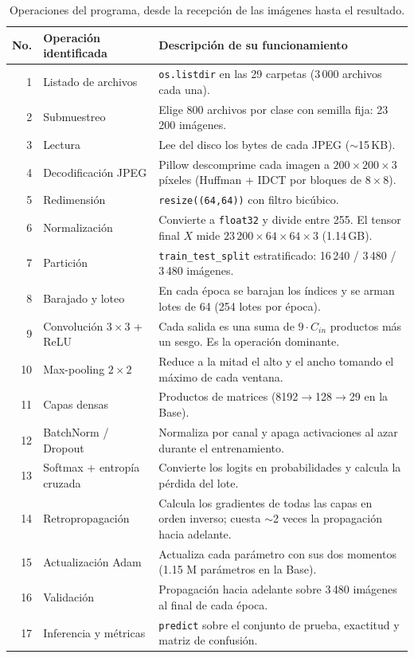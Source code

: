 \documentclass[11pt,letterpaper]{article}
\newcommand{\cod}[1]{\texttt{#1}}
\begin{document}
\begin{table}[H]\centering\small
\caption{Operaciones del programa, desde la recepción de las imágenes hasta el resultado.}
\label{tab:operaciones}
\begin{tabular}{rlp{10.2cm}}
\toprule
No. & Operación identificada & Descripción de su funcionamiento \\
\midrule
1 & Listado de archivos & \cod{os.listdir} en las 29 carpetas (3\,000 archivos cada una). \\
2 & Submuestreo & Elige 800 archivos por clase con semilla fija: 23\,200 imágenes. \\
3 & Lectura & Lee del disco los bytes de cada JPEG ($\sim$15\,KB). \\
4 & Decodificación JPEG & Pillow descomprime cada imagen a $200\times200\times3$ píxeles (Huffman + IDCT por bloques de $8\times8$). \\
5 & Redimensión & \cod{resize((64,64))} con filtro bicúbico. \\
6 & Normalización & Convierte a \cod{float32} y divide entre 255. El tensor final $X$ mide $23\,200\times64\times64\times3$ (1.14\,GB). \\
7 & Partición & \cod{train\_test\_split} estratificado: 16\,240 / 3\,480 / 3\,480 imágenes. \\
8 & Barajado y loteo & En cada época se barajan los índices y se arman lotes de 64 (254 lotes por época). \\
9 & Convolución $3\times3$ + ReLU & Cada salida es una suma de $9\cdot C_{in}$ productos más un sesgo. Es la operación dominante. \\
10 & Max-pooling $2\times2$ & Reduce a la mitad el alto y el ancho tomando el máximo de cada ventana. \\
11 & Capas densas & Productos de matrices (8192$\rightarrow$128$\rightarrow$29 en la Base). \\
12 & BatchNorm / Dropout & Normaliza por canal y apaga activaciones al azar durante el entrenamiento. \\
13 & Softmax + entropía cruzada & Convierte los logits en probabilidades y calcula la pérdida del lote. \\
14 & Retropropagación & Calcula los gradientes de todas las capas en orden inverso; cuesta $\sim$2 veces la propagación hacia adelante. \\
15 & Actualización Adam & Actualiza cada parámetro con sus dos momentos (1.15 M parámetros en la Base). \\
16 & Validación & Propagación hacia adelante sobre 3\,480 imágenes al final de cada época. \\
17 & Inferencia y métricas & \cod{predict} sobre el conjunto de prueba, exactitud y matriz de confusión. \\
\bottomrule
\end{tabular}
\end{table}
\end{document}
